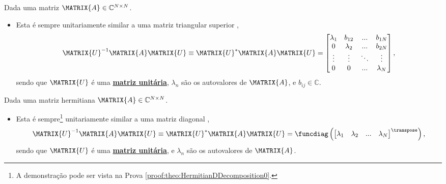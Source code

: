 \begin{theorem}\label{theo:ShurDecomposition0}
Dada uma matriz $\MATRIX{A} \in \mathbb{C}^{N \times N}$.
\begin{itemize}
\item Esta é sempre  unitariamente similar a uma matriz triangular superior 
\cite[pp. 59]{axelsson1996iterative} \cite[pp. 351]{golub2013matrix},
\begin{equation}
\MATRIX{U}^{-1} \MATRIX{A} \MATRIX{U} \equiv
\MATRIX{U}^{\ast} \MATRIX{A} \MATRIX{U} =
\begin{bmatrix}
\lambda_1 & b_{12}    & ...    & b_{1N} \\
0         & \lambda_2 & ...    & b_{2N} \\
\vdots    & \vdots    & \ddots & \vdots \\
0         & 0         & ...    & \lambda_N
\end{bmatrix},
\end{equation}
sendo que $\MATRIX{U}$ é uma \hyperref[def:unitarymatrix0]{\textbf{matriz unitária}},
$\lambda_n$ são os autovalores de $\MATRIX{A}$, e $b_{ij}\in \mathbb{C}$.
\end{itemize}
\end{theorem}

\begin{theorem}\label{theo:HermitianDDecomposition0}
Dada uma matriz hermitiana $\MATRIX{A} \in \mathbb{C}^{N \times N}$.
\begin{itemize}
\item Esta é sempre\footnote{A
demonstração pode ser vista na Prova \ref{proof:theo:HermitianDDecomposition0}.}  
unitariamente similar a uma matriz diagonal
\cite[pp. 60]{axelsson1996iterative},
\begin{equation}
\MATRIX{U}^{-1} \MATRIX{A} \MATRIX{U} \equiv
\MATRIX{U}^{\ast} \MATRIX{A} \MATRIX{U} =
\funcdiag\left(
\begin{bmatrix}
\lambda_1 & \lambda_2 & ...    & \lambda_N \\
\end{bmatrix}^{\transpose}\right),
\end{equation}
sendo que $\MATRIX{U}$ é uma \hyperref[def:unitarymatrix0]{\textbf{matriz unitária}}, e
$\lambda_n$ são os autovalores de $\MATRIX{A}$.
\end{itemize}
\end{theorem}


